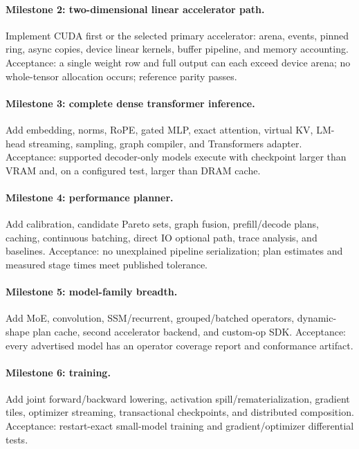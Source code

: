 \paragraph{Milestone 2: two-dimensional linear accelerator path.}
Implement CUDA first or the selected primary accelerator: arena, events, pinned ring, async copies, device linear kernels, buffer pipeline, and memory accounting. Acceptance: a single weight row and full output can each exceed device arena; no whole-tensor allocation occurs; reference parity passes.

\paragraph{Milestone 3: complete dense transformer inference.}
Add embedding, norms, RoPE, gated MLP, exact attention, virtual KV, LM-head streaming, sampling, graph compiler, and Transformers adapter. Acceptance: supported decoder-only models execute with checkpoint larger than VRAM and, on a configured test, larger than DRAM cache.

\paragraph{Milestone 4: performance planner.}
Add calibration, candidate Pareto sets, graph fusion, prefill/decode plans, caching, continuous batching, direct IO optional path, trace analysis, and baselines. Acceptance: no unexplained pipeline serialization; plan estimates and measured stage times meet published tolerance.

\paragraph{Milestone 5: model-family breadth.}
Add MoE, convolution, SSM/recurrent, grouped/batched operators, dynamic-shape plan cache, second accelerator backend, and custom-op SDK. Acceptance: every advertised model has an operator coverage report and conformance artifact.

\paragraph{Milestone 6: training.}
Add joint forward/backward lowering, activation spill/rematerialization, gradient tiles, optimizer streaming, transactional checkpoints, and distributed composition. Acceptance: restart-exact small-model training and gradient/optimizer differential tests.

